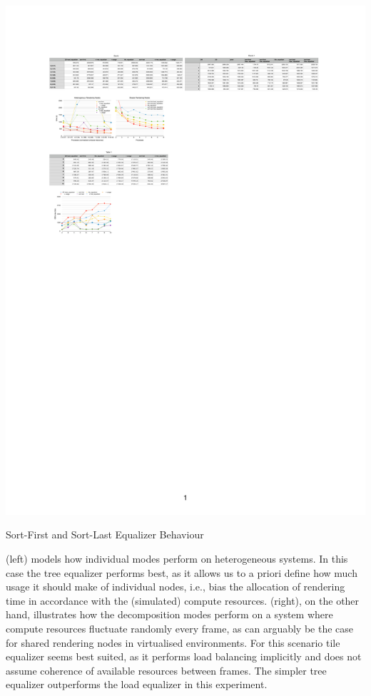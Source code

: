 \begin{benchmark}[h!t]
  \includegraphics[width=\textwidth]{results/equalizers}
  \caption{\label{rEqualizers}Sort-First and Sort-Last Equalizer Behaviour}
\end{benchmark}

 (left) models how individual modes perform on heterogeneous
systems. In this case the tree equalizer performs best, as it allows us to a
priori define how much usage it should make of individual nodes, i.e., bias the
allocation of rendering time in accordance with the (simulated) compute
resources.  (right), on the other hand, illustrates how the
decomposition modes perform on a system where compute resources fluctuate
randomly every frame, as can arguably be the case for shared rendering nodes in
virtualised environments. For this scenario tile equalizer seems best suited,
as it performs load balancing implicitly and does not assume coherence of
available resources between frames. The simpler tree equalizer outperforms the
load equalizer in this experiment.

